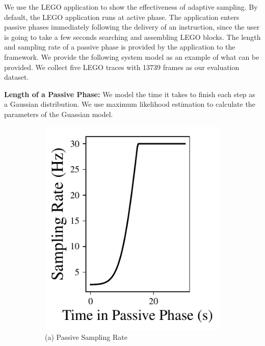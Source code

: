 We use the LEGO application to show the effectiveness of adaptive
sampling. By default, the LEGO application runs at active phase. The
application enters passive phases immediately following the delivery
of an instruction, since the user is going to take a few seconds
searching and assembling LEGO blocks. The length and sampling rate of
a passive phase is provided by the application to the framework. We
provide the following system model as an example of what can be
provided. We collect five LEGO traces with 13739 frames as our
evaluation dataset.

\textbf{Length of a Passive Phase: }
We model the time it takes to finish each step as a Gaussian distribution. We
use maximum likelihood estimation to calculate the parameters of the Guassian
model.

 
\begin{figure}
\small\centering
\begin{subfigure}{.45\linewidth}
  \centering
  \includegraphics[width=\linewidth, trim=0em 0em 0em 0em, clip]{FIGS/fig-lego-adaptive-sr.pdf}
  {\small (a) Passive Sampling Rate}
\end{subfigure}
\begin{subfigure}{.45\linewidth}

\end{subfigure}
\end{figure}

